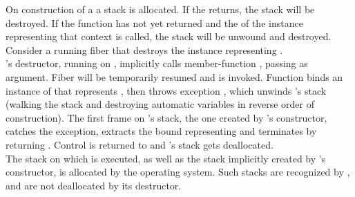 \label{destruction}

On construction of a \fiber a stack is allocated. If the \entryfn\xspace returns,
the stack will be destroyed. If the function has not yet returned and the
 of the \fiber instance representing that context is called,
the stack will be unwound and destroyed.\\

Consider a running fiber  that destroys the \fiber instance
representing .\\

's destructor, running on , implicitly calls member-function
\resumewith, passing \unwindfib as
argument. Fiber  will be temporarily resumed and \unwindfib is
invoked. Function \unwindfib binds an instance of \fiber that
represents , then throws exception \unwindex, which
unwinds 's stack
(walking the stack and destroying automatic variables in reverse order of
construction).
The first frame on 's stack, the one created by \fiber's constructor,
catches the exception,
extracts the bound \fiber representing  and terminates  by returning
. Control is returned to  and 's
stack gets deallocated.\\

The stack on which  is executed, as well as the stack implicitly
created by \thread's constructor, is allocated by the operating
system. Such stacks are recognized by \fiber, and are not deallocated by its
destructor.
